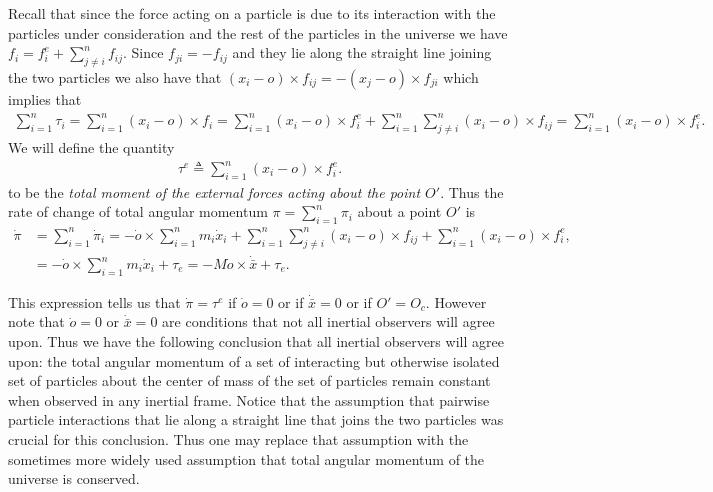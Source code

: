 \documentclass[graybox,envcountchap,sectrefs]{svmonoMuga}
\begin{document}
Recall that since the force acting on a particle is due to its interaction with the  particles under consideration and the rest of the particles in the universe we have $f_i=f_i^e+\sum_{j\neq i}^nf_{ij}$. Since  $f_{ji}=-f_{ij}$ and they lie along the straight line joining the two particles we also have that
$(x_i-o)\times  f_{ij}=-(x_j-o)\times  f_{ji}$ which implies that 
\begin{align*}
\sum_{i=1}^n\tau_i=\sum_{i=1}^n(x_i-o)\times f_i=\sum_{i=1}^n(x_i-o)\times  f_{i}^e+\sum_{i=1}^n\sum_{j\neq i}^n(x_i-o)\times  f_{ij}=\sum_{i=1}^n(x_i-o)\times  f_{i}^e.
\end{align*}
We will define the quantity 
\begin{align*}
{\tau^e}\triangleq \sum_{i=1}^n(x_i-o)\times  f_{i}^e.
\end{align*}
to be the \emph{total moment of the external forces acting about the point $O'$}.
Thus the rate of change of total angular momentum $\pi=\sum_{i=1}^n\pi_i$ about a point $O'$ is
\begin{align*}
\dot{\pi}&=\sum_{i=1}^n\dot{\pi}_i= -\dot{o}\times \sum_{i=1}^nm_i\dot{x}_i+\sum_{i=1}^n\sum_{j\neq i}^n(x_i-o)\times  f_{ij}+\sum_{i=1}^n(x_i-o)\times  f_{i}^e,\\
&=-\dot{o}\times \sum_{i=1}^nm_i\dot{x}_i+\tau_e=-M\dot{o}\times \dot{\bar{x}}+\tau_e.
\end{align*}

This expression tells us that $\dot{\pi}=\tau^e$  if $\dot{o}=0$ or if  $\dot{\bar{x}}=0$ or if $O'=O_c$. However note that $\dot{o}=0$ or  $\dot{\bar{x}}=0$ are conditions that not all inertial observers will agree upon. Thus we have the following conclusion that all inertial observers will agree upon:  the total angular momentum of a set of interacting but otherwise isolated set of particles  about the center of mass of the set of particles remain constant when observed in any inertial frame. Notice that the assumption that pairwise particle interactions that lie along a straight line that joins the two particles was crucial for this conclusion. Thus one may replace that assumption with the sometimes more widely used assumption that total angular momentum of the universe is conserved. 
\end{document}
